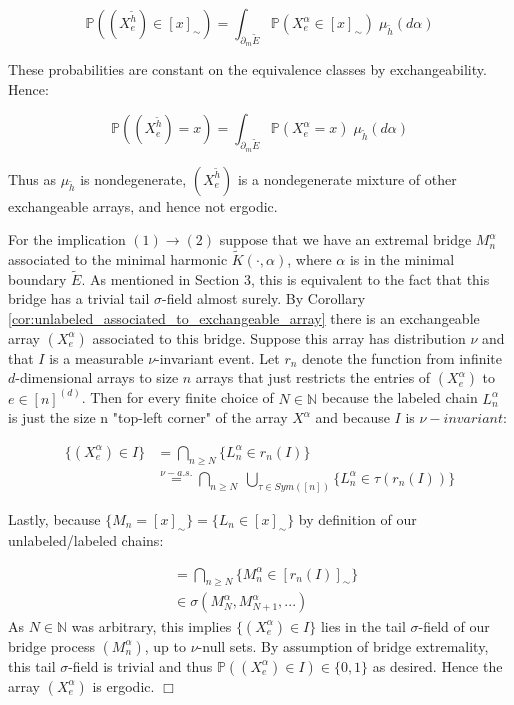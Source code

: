 \documentclass[11pt,oneside,reqno]{article}
\theoremstyle{plain}
\theoremstyle{definition}
\numberwithin{equation}{section}
\renewcommand{\geq}{\geqslant}
\newcommand{\N}{\mathbb{N}}
\renewcommand{\P}{\mathbb{P}}
\newcommand{\tK}{\tilde{K}}
\newcommand{\tE}{\tilde{E}}
\begin{document}
\[\P((X^{\tilde{h}}_e) \in [x]_\sim) = \int_{\partial_m \tilde{E}} \P(X_e^\alpha \in [x]_\sim) \; \mu_{\tilde{h}}(d\alpha)\]

\noindent These probabilities are constant on the equivalence classes by exchangeability. Hence:

\[\P((X^{\tilde{h}}_e) = x) = \int_{\partial_m \tilde{E}} \P(X_e^\alpha = x) \; \mu_{\tilde{h}}(d\alpha)\]

\noindent Thus as $\mu_{\tilde{h}}$ is nondegenerate, $(X_e^{\tilde{h}})$ is a nondegenerate mixture of other exchangeable arrays, and hence not ergodic. 

For the implication $(1) \to (2)$ suppose that we have an extremal bridge $M_n^{\alpha}$ associated to the minimal harmonic $\tK(\cdot, \alpha)$, where $\alpha$ is in the minimal boundary  $\tE$. As mentioned in Section 3, this is equivalent to the fact that this bridge has a trivial tail $\sigma$-field almost surely. By Corollary \ref{cor:unlabeled_associated_to_exchangeable_array} there is an exchangeable array $(X_e^\alpha)$ associated to this bridge. Suppose this array has distribution $\nu$ and that $I$ is a measurable $\nu$-invariant event. Let $r_n$ denote the function from infinite $d$-dimensional arrays to size $n$ arrays that just restricts the entries of $(X^\alpha_e)$ to $e \in [n]^{(d)}$. Then for every finite choice of $N \in \N$ because the labeled chain $L_n^\alpha$ is just the size n "top-left corner" of the array $X^\alpha$ and because $I$ is $\nu-invariant$:

\begin{align*}
    \{(X_e^\alpha) \in I \} & = \bigcap_{n \geq N} \{L_n^\alpha \in r_n(I)\} \\
    & \overset{\nu-a.s.}{=} \bigcap_{n \geq N} \; \bigcup_{\tau \in Sym([n])} \{L_n^\alpha \in \tau (r_n(I))\} 
\end{align*}

\noindent Lastly, because $\{M_n = [x]_\sim\} = \{L_n \in [x]_\sim\}$ by definition of our unlabeled/labeled chains:

\begin{align*}
    &    = \bigcap_{n \geq N} \{M_n^\alpha \in [r_n(I)]_\sim \} \\
    & \in \sigma(M_N^\alpha, M_{N+1}^\alpha, ...) 
\end{align*}
% 
\noindent As $N \in \N$ was arbitrary, this implies $\{(X^\alpha_e) \in I\}$ lies in the tail $\sigma$-field of our bridge process $(M_n^\alpha)$, up to $\nu$-null sets. By assumption of bridge extremality, this tail $\sigma$-field is trivial and thus $\P((X^\alpha_e) \in I) \in \{0,1\}$ as desired. Hence the array $(X^\alpha_e)$ is ergodic. $\Box$\\
%
\end{document}
